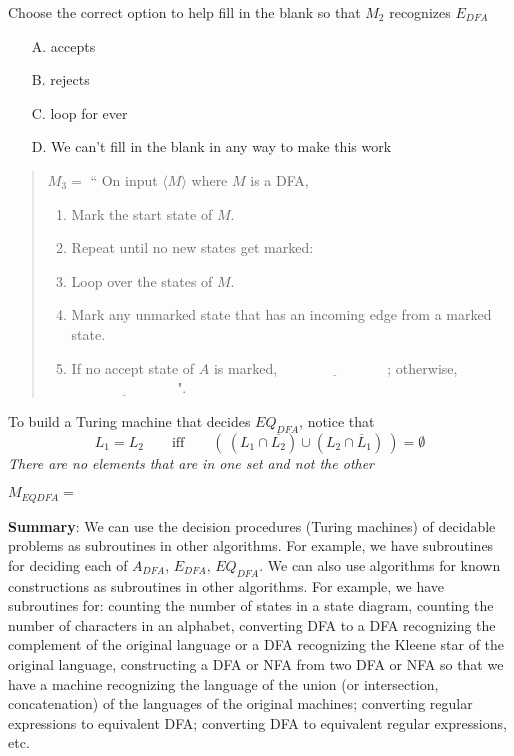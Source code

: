 \documentclass[12pt, oneside]{article}
\begin{document}
Choose the correct option to help fill in the blank so that $M_2$ recognizes $E_{DFA}$
\begin{itemize}
\item[A.] accepts
\item[B.] rejects
\item[C.] loop for ever
\item[D.] We can't fill in the blank in any way to make this work
\end{itemize}

\newpage
  

  
  \begin{quote}
  $M_3 =  $ `` On  input $\langle M \rangle$ where $M$ is  a  DFA,
  \begin{enumerate}
  \item Mark the start  state  of $M$.
  \item Repeat until no  new states get marked:
  \item \qquad Loop over the states of $M$. 
  \item \qquad Mark any unmarked  state  that  has an incoming  edge  from a marked state.
  \item If  no  accept state of $A$ is  marked, $\underline{\phantom{FILL  IN BLANK}}$;  otherwise, 
  $\underline{\phantom{FILL  IN BLANK}}$".
  \end{enumerate}
  \end{quote}
  
  
  
To build a Turing machine that decides $EQ_{DFA}$, notice that 
\[
L_1 = L_2 \qquad\textrm{iff}\qquad (~(L_1 \cap \overline{L_2}) \cup (L_2 \cap \overline L_1)~) = \emptyset  
\]
{\it There are no elements that are in one set and not the other}


$M_{EQDFA} = $ 


  \vfill
  

  {\bf Summary}:  We can use the decision procedures (Turing machines) of decidable problems
  as subroutines in other algorithms. For example, we have subroutines for deciding each of 
  $A_{DFA}$, $E_{DFA}$, $EQ_{DFA}$.  We can also use algorithms for known constructions
  as subroutines in other algorithms. For example, we have subroutines for: counting the number 
  of states in a state diagram, counting the number of characters in an alphabet, converting DFA
  to a DFA recognizing the complement of the original language or a DFA recognizing the 
  Kleene star of the original language, constructing a DFA or NFA from two DFA or NFA so that 
  we have a machine recognizing the language of the union (or intersection, concatenation)
  of the languages of the original machines; converting regular expressions to equivalent DFA; 
  converting DFA to equivalent regular expressions, etc.
 \vfill
\end{document}
